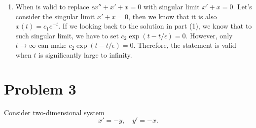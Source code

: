 \documentclass[12pt]{exam}
\begin{document}
\begin{enumerate}
\begin{figure}[H]
				\end{figure}

	\item When is valid to replace $\epsilon x''+x'+x=0$ with singular limit $x'+x=0$. 
					Let's consider the singular limit $x'+x=0$, then we know that it is also $x(t) = c_1e^{-t}$. If we looking back to the solution in part (1), we know that to such singular limit, we have to set $c_2\exp(t-t/\epsilon)=0$. However, only $t \to \infty$ can make $c_2\exp(t-t/\epsilon)=0$. Therefore, the statement is valid when $t$ is significantly large to infinity.

\end{enumerate}


\section*{Problem 3}
Consider two-dimensional system
\[x'=-y, \quad y'=-x.\]
\end{document}
